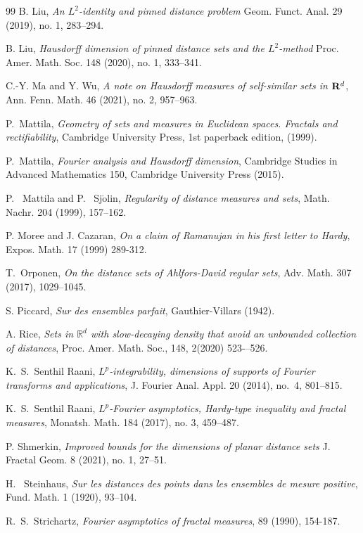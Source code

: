 \documentclass[a4paper,11pt]{amsart}
\numberwithin{equation}{section}
\begin{document}
\begin{thebibliography}{99}
 B. Liu, {\textit{An $L^2$-identity and pinned distance problem}} Geom. Funct. Anal. 29 (2019), no. 1, 283–294. 

 B. Liu, {\textit{Hausdorff dimension of pinned distance sets and the $L^2$-method}} Proc. Amer. Math. Soc. 148 (2020), no. 1, 333–341.

 C.-Y. Ma and Y. Wu, {\textit{A note on Hausdorff measures of self-similar sets in ${\bf R}^d$}}, Ann. Fenn. Math. 46 (2021), no. 2, 957–963. 

 P.\ Mattila, \textit{Geometry of sets and measures in Euclidean spaces. Fractals and rectifiability},  Cambridge University Press, 1st paperback edition, (1999).  

 P.\ Mattila, \textit{Fourier analysis and Hausdorff dimension},  Cambridge Studies in Advanced Mathematics 150, Cambridge University Press (2015). 

 P. \ Mattila and P. \ Sj$\ddot{\text{o}}$lin, \textit{Regularity of distance measures and sets}, Math. Nachr. 204 (1999), 157–162.

 P. Moree and J. Cazaran, {\em{On a claim of Ramanujan in his first letter to Hardy}}, Expos. Math. 17 (1999) 289-312.

 T.~Orponen, {\em{On the distance sets of Ahlfors-David regular sets}}, Adv. Math. 307 (2017), 1029–1045. 

 S. Piccard, \textit{Sur des ensembles parfait}, Gauthier-Villars (1942). 

 A. Rice, \textit{Sets in $\mathbb R^d$ with slow-decaying density that avoid an unbounded collection of distances}, Proc. Amer. Math. Soc., 148, 2(2020) 523-–526.

 K.~S.~Senthil Raani, \textit{$L^p$-integrability, dimensions of supports of Fourier transforms and applications}, J. Fourier Anal. Appl. 20 (2014), no.~4, 801–815.

 K.~S.~Senthil Raani, \textit{$L^p$-Fourier asymptotics, Hardy-type inequality and fractal measures}, Monatsh. Math. 184 (2017), no. 3, 459–487. 

 P. Shmerkin, {\textit{Improved bounds for the dimensions of planar distance sets}} J. Fractal Geom. 8 (2021), no. 1, 27–51.

 H. \ Steinhaus, \textit{Sur les distances des points dans les ensembles de mesure positive}, Fund. Math.
1 (1920), 93–104.

 R.~S.~Strichartz, \textit{Fourier asymptotics of fractal measures}, 89 (1990), 154-187.

\end{thebibliography}


\Addresses 
\end{document}
